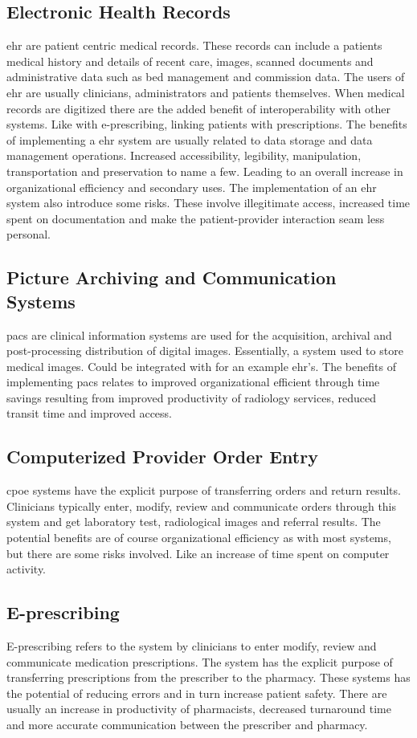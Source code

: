 \subsection{Electronic Health Records}
\gls{ehr} are patient centric medical records. 
These records can include a patients medical history and details of recent care, images, scanned documents and administrative data such as bed management and commission data.
The users of \gls{ehr} are usually clinicians, administrators and patients themselves. 
When medical records are digitized there are the added benefit of interoperability with other systems.
Like with e-prescribing, linking patients with prescriptions. 
The benefits of implementing a \gls{ehr} system are usually related to data storage and data management operations. Increased accessibility, legibility, manipulation, transportation and preservation to name a few. Leading to an overall increase in organizational efficiency and secondary uses. The implementation of an \gls{ehr} system also introduce some risks.
These involve illegitimate access, increased time spent on documentation and make the patient-provider interaction seam less personal.


\subsection{Picture Archiving and Communication Systems}
\gls{pacs} are clinical information systems are used for the acquisition, archival and post-processing distribution of digital images. 
Essentially, a system used to store medical images.
Could be integrated with for an example \gls{ehr}'s.
The benefits of implementing \gls{pacs} relates to improved organizational efficient through time savings resulting from improved productivity of radiology services, reduced transit time and improved access. 

\subsection{Computerized Provider Order Entry}
\gls{cpoe} systems have the explicit purpose of transferring orders and return results.
Clinicians typically enter, modify, review and communicate orders through this system and get laboratory test, radiological images and referral results. 
The potential benefits are of course organizational efficiency as with most systems, but there are some risks involved. Like an increase of time spent on computer activity.

\subsection{E-prescribing}
E-prescribing refers to the system by clinicians to enter modify, review and communicate medication prescriptions. 
The system has the explicit purpose of transferring prescriptions from the prescriber to the pharmacy.
These systems has the potential of reducing errors and in turn increase patient safety. 
There are usually an increase in productivity of pharmacists, decreased turnaround time and more accurate communication between the prescriber and pharmacy. 

